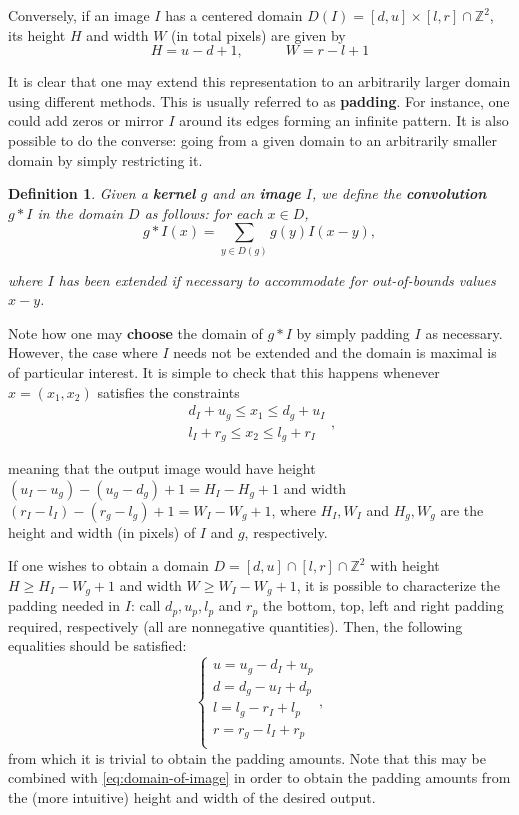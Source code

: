 \documentclass{article}
\newtheorem{definition}{Definition}
\begin{document}
Conversely, if an image \(I\) has a centered domain \(D(I)=[d, u]\times[l, r]\cap\mathbb{Z}^2\), its height \(H\) and width \(W\) (in total pixels) are given by
\begin{equation}\label{eq:dimensions-given-domain}
  H = u - d + 1, \text{~~~~~~~~~} W = r - l + 1
\end{equation}

It is clear that one may extend this representation to an arbitrarily larger domain using different methods. This is usually referred to as \textbf{padding}. For instance, one could add zeros or mirror \(I\) around its edges forming an infinite pattern. It is also possible to do the converse: going from a given domain to an arbitrarily smaller domain by simply restricting it.

\begin{definition}
Given a \textbf{kernel} \(g\) and an \textbf{image} \(I\), we define the \textbf{convolution} \(g\ast I\) in the domain \(D\) as follows: for each \(x\in D\),
\[
  g\ast I(x) = \sum_{y\in D(g)}g(y)I(x-y)
,\]

where \(I\) has been extended if necessary to accommodate for out-of-bounds values \(x-y\).
\end{definition}

Note how one may \textbf{choose} the domain of \(g\ast I\) by simply padding \(I\) as necessary. However, the case where \(I\) needs not be extended and the domain is maximal is of particular interest. It is simple to check that this happens whenever \(x=(x_1, x_2)\) satisfies the constraints
\[
\begin{align}
  d_I+u_g \leq x_1 \leq d_g + u_I\\
  l_I+r_g \leq x_2 \leq l_g + r_I
\end{align}
,\]

meaning that the output image would have height \((u_I-u_g)-(u_g-d_g) +1 = H_I - H_g + 1\) and width \((r_I-l_I) - (r_g - l_g) + 1 = W_I - W_g + 1\), where \(H_I, W_I\) and \(H_g, W_g\) are the height and width (in pixels) of \(I\) and \(g\), respectively.

If one wishes to obtain a domain \(D=[d, u]\cap[l, r]\cap \mathbb{Z}^2\) with height \(H \geq H_I - W_g + 1\) and width \(W \geq W_I - W_g + 1\), it is possible to characterize the padding needed in \(I\): call \(d_p, u_p, l_p\) and \(r_p\) the bottom, top, left and right padding required, respectively (all are nonnegative quantities). Then, the following equalities should be satisfied:
\[
\left\{
\begin{align}
  u = u_g - d_I + u_p\\
  d = d_g - u_I + d_p\\
  l = l_g - r_I + l_p\\
  r = r_g - l_I + r_p\\
\end{align}
\right.
,\]
from which it is trivial to obtain the padding amounts. Note that this may be combined with \cref{eq:domain-of-image} in order to obtain the padding amounts from the (more intuitive) height and width of the desired output.
\end{document}

